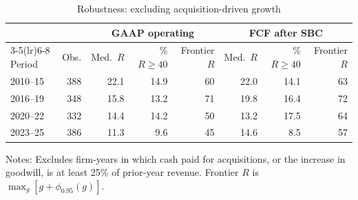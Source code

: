 \begin{table}[t]\centering\small
\caption{Robustness: excluding acquisition-driven growth}\label{tab:organic}
\begin{tabular}{lrrrrrrr}\toprule
 & & \multicolumn{3}{c}{GAAP operating} & \multicolumn{3}{c}{FCF after SBC}\\\cmidrule(lr){3-5}\cmidrule(lr){6-8}
Period & Obs. & Med.\ $R$ & \% $R\geq40$ & Frontier $R$ & Med.\ $R$ & \% $R\geq40$ & Frontier $R$\\\midrule
2010--15 & 388 & 22.1 & 14.9 & 60 & 22.0 & 14.1 & 63 \\
2016--19 & 348 & 15.8 & 13.2 & 71 & 19.8 & 16.4 & 72 \\
2020--22 & 332 & 14.4 & 14.2 & 50 & 13.2 & 17.5 & 64 \\
2023--25 & 386 & 11.3 & 9.6 & 45 & 14.6 & 8.5 & 57 \\
\bottomrule\end{tabular}
\par\vspace{2pt}\footnotesize\raggedright Notes: Excludes firm-years in which cash paid for acquisitions, or the increase in goodwill, is at least 25\% of prior-year revenue. Frontier $R$ is $\max_g[g+\phi_{0.95}(g)]$.
\end{table}